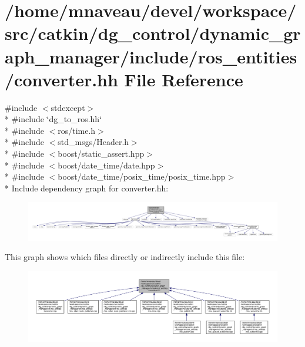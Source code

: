 \hypertarget{converter_8hh}{}\section{/home/mnaveau/devel/workspace/src/catkin/dg\+\_\+control/dynamic\+\_\+graph\+\_\+manager/include/ros\+\_\+entities/converter.hh File Reference}
\label{converter_8hh}
{\ttfamily \#include $<$stdexcept$>$}\\*
{\ttfamily \#include \char`\"{}dg\+\_\+to\+\_\+ros.\+hh\char`\"{}}\\*
{\ttfamily \#include $<$ros/time.\+h$>$}\\*
{\ttfamily \#include $<$std\+\_\+msgs/\+Header.\+h$>$}\\*
{\ttfamily \#include $<$boost/static\+\_\+assert.\+hpp$>$}\\*
{\ttfamily \#include $<$boost/date\+\_\+time/date.\+hpp$>$}\\*
{\ttfamily \#include $<$boost/date\+\_\+time/posix\+\_\+time/posix\+\_\+time.\+hpp$>$}\\*
Include dependency graph for converter.\+hh\+:\nopagebreak
\begin{figure}[H]
\begin{center}
\leavevmode
\includegraphics[width=350pt]{converter_8hh__incl}
\end{center}
\end{figure}
This graph shows which files directly or indirectly include this file\+:\nopagebreak
\begin{figure}[H]
\begin{center}
\leavevmode
\includegraphics[width=350pt]{converter_8hh__dep__incl}
\end{center}
\end{figure}
